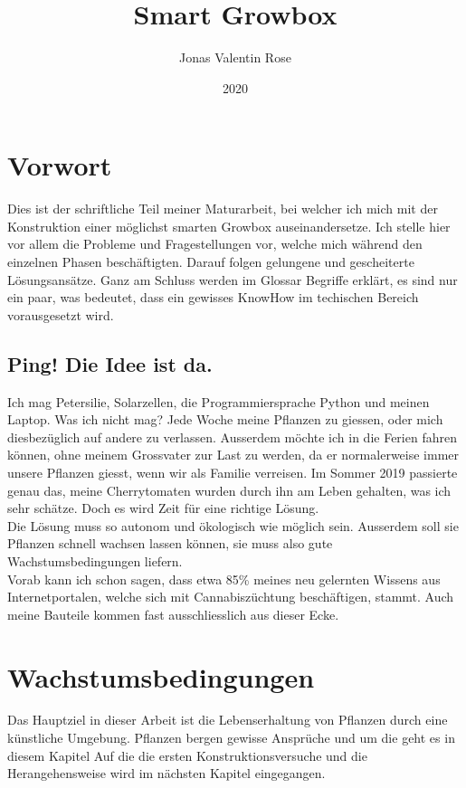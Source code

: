 \documentclass[12pt,titlepage,a4paper]{article}
\begin{document}
\begin{titlepage}
\title{Smart Growbox}
\date{2020}
\author{Jonas Valentin Rose}
\end{titlepage}
\maketitle 
\tableofcontents
\newpage
\section{Vorwort}
Dies ist der schriftliche Teil meiner Maturarbeit, bei welcher ich mich  mit der Konstruktion einer möglichst smarten Growbox auseinandersetze. Ich stelle hier vor allem die Probleme und Fragestellungen vor, welche mich während den einzelnen Phasen beschäftigten. Darauf folgen gelungene und gescheiterte Lösungsansätze. Ganz am Schluss werden im Glossar Begriffe erklärt, es sind nur ein paar, was bedeutet, dass ein gewisses KnowHow im techischen Bereich vorausgesetzt wird.

\subsection{Ping! Die Idee ist da.}
Ich mag Petersilie, Solarzellen, die Programmiersprache Python und meinen Laptop. Was ich nicht mag? Jede Woche meine Pflanzen zu giessen, oder mich diesbezüglich auf andere zu verlassen. Ausserdem möchte ich in die Ferien fahren können, ohne meinem Grossvater zur Last zu werden, da er normalerweise immer unsere Pflanzen giesst, wenn wir als Familie verreisen. Im Sommer 2019 passierte genau das, meine Cherrytomaten wurden durch ihn am Leben gehalten, was ich sehr schätze. Doch es wird Zeit für eine richtige Lösung. \\Die Lösung muss so autonom und ökologisch wie möglich sein. Ausserdem soll sie Pflanzen schnell wachsen lassen können, sie muss also gute Wachstumsbedingungen liefern. \\ Vorab kann ich schon sagen, dass etwa 85\% meines neu gelernten Wissens aus Internetportalen, welche sich mit Cannabiszüchtung beschäftigen, stammt. Auch meine Bauteile kommen fast ausschliesslich aus dieser Ecke.


\section{Wachstumsbedingungen}
Das Hauptziel in dieser Arbeit ist die Lebenserhaltung von Pflanzen durch eine künstliche Umgebung. Pflanzen bergen gewisse Ansprüche und um die geht es in diesem Kapitel
Auf die die ersten Konstruktionsversuche und die Herangehensweise wird im nächsten Kapitel eingegangen.
\end{document}
